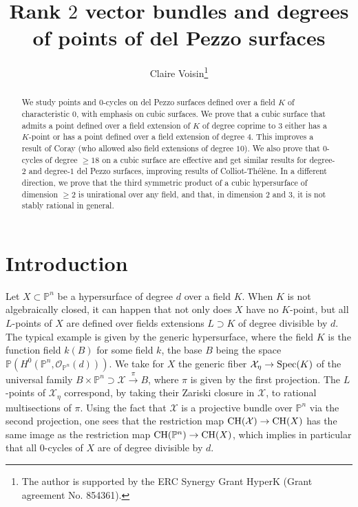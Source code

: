 \documentclass[10pt]{article}
\title{Rank $2$ vector bundles and   degrees of points of del Pezzo surfaces}
\author{Claire Voisin\footnote{The author is supported by the ERC Synergy Grant HyperK (Grant agreement No. 854361).}}
\date{}
\begin{document}
\maketitle
\begin{abstract} We study  points and $0$-cycles on del Pezzo surfaces defined over a field $K$ of characteristic $0$, with emphasis on cubic surfaces. We prove that a cubic surface that admits a point defined over a field extension of $K$  of degree coprime to $3$ either has a $K$-point or has a point defined over a field extension of degree $4$. This improves a result of Coray (who allowed also field extensions of degree $10$). We also prove that $0$-cycles of degree $\geq 18$ on a cubic surface are effective and get similar results for degree-$2$ and degree-$1$ del Pezzo surfaces, improving results of Colliot-Th\'{e}l\`{e}ne. In a different direction, we prove that the third symmetric product of a cubic hypersurface of dimension $\geq 2$ is unirational over any field, and that, in dimension $2$  and $3$, it is not  stably rational in general.
 \end{abstract}
\section{Introduction}
Let $X\subset \mathbb{P}^n$ be a hypersurface of degree $d$ over a field $K$. When $K$ is not algebraically closed, it can happen  that not only does $X$ have no $K$-point, but all $L$-points of $X$ are defined over fields extensions $ L\supset K$ of degree divisible by $d$. The typical example is given by the generic hypersurface, where the field $K$ is the function field
$k(B)$ for some field $k$, the base $B$ being the space $\mathbb{P}(H^0(\mathbb{P}^n,\mathcal{O}_{\mathbb{P}^n}(d)))$. We take for $X$ the generic fiber $\mathcal{X}_\eta\rightarrow {\rm Spec}(K)$ of the universal family
$B\times \mathbb{P}^n\supset\mathcal{X}\stackrel{\pi}{\rightarrow} B$, where $\pi$ is given by the first projection. The $L$-points of $\mathcal{X}_\eta$ correspond,  by taking  their Zariski closure in $\mathcal{X}$, to rational multisections of $\pi$. Using the fact that $\mathcal{X}$ is a projective bundle over $\mathbb{P}^n$ via the second projection, one  sees that the restriction map  ${\rm CH}(\mathcal{X})\rightarrow {\rm CH}({X})$ has the same image as the restriction map
${\rm CH}(\mathbb{P}^n)\rightarrow {\rm CH}({X})$, which implies in particular that all $0$-cycles of $X$ are of degree divisible by $d$.
\end{document}

